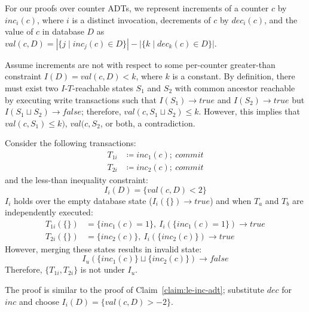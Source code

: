 For our proofs over counter ADTs, we represent increments of a counter $c$ by $inc_i(c)$, where $i$ is a distinct invocation, decrements of $c$ by $dec_i(c)$, and the value of $c$ in database $D$ as $val(c, D) = |\{j \mid inc_j(c) \in D\}| - |\{k \mid dec_k(c) \in D\}|$.

\begin{claim} \label{claim:ge-inc-adt}
Assume increments are not \iconfluent with respect to some per-counter greater-than constraint $I(D)=val(c, D) < k$, where $k$ is a constant. By definition, there must exist two $I$-$T$-reachable states $S_1$ and $S_2$ with common ancestor reachable by executing write transactions such that $I(S_1) \rightarrow true$ and $I(S_2) \rightarrow true$ but $I(S_1 \sqcup S_2) \rightarrow false$; therefore, $val(c, S_1 \sqcup S_2) \leq k$. However, this implies that $val(c, S_1) \leq k)$, $val(c, S_2$, or both, a contradiction.  \end{claim}

\begin{claim}
\label{claim:le-inc-adt}
Consider the following transactions:
\begin{align*}
T_{1i}&\coloneqq inc_1(c);~commit\\
T_{2i}&\coloneqq inc_2(c);~commit
\end{align*}
and the less-than inequality constraint:
$$I_i(D) = \{val(c, D) < 2\}$$
$I_i$ holds over the empty database state ($I_i(\{\}) \rightarrow true$) and when $T_a$ and $T_b$ are independently executed:
\begin{align*}
T_{1i}(\{\})&=\{inc_1(c)=1\},~I_i(\{inc_1(c)=1\}) \rightarrow true\\
T_{2i}(\{\})&=\{inc_2(c)\},~I_i(\{inc_2(c)\}) \rightarrow true
\end{align*}
However, merging these states results in invalid state:
$$I_u(\{inc_1(c)\}\sqcup \{inc_2(c)\}) \rightarrow false$$
Therefore, $\{T_{1i}, T_{2i}\}$ is not \iconfluent under $I_u$.
\end{claim}

\begin{claim} The proof is similar to the proof of Claim~\ref{claim:le-inc-adt}; substitute $dec$ for $inc$ and choose $I_i(D) = \{val(c,D) > -2\}$.  \end{claim}

